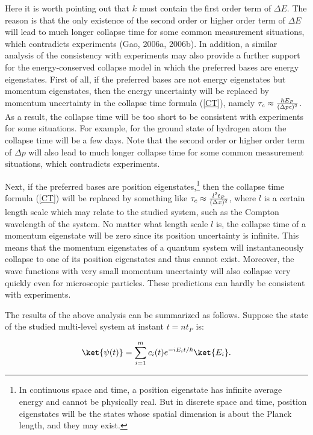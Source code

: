 Here it is worth pointing out that $k$ must contain the first order term of $ \Delta E$. The reason is that the only existence of the second order or higher order term of $ \Delta E$ will lead to much longer collapse time for some common measurement situations, which contradicts experiments (Gao, 2006a, 2006b). In addition, a similar analysis of the consistency with experiments may also provide a further support for the energy-conserved collapse model in which the preferred bases are energy eigenstates. First of all, if the preferred bases are not energy eigenstates but momentum eigenstates, then the energy uncertainty will be replaced by momentum uncertainty in the collapse time formula (\ref{CT}), namely $\tau_c \approx {\hbar E_P \over {(\Delta p c)^2}}$. As a result, the collapse time will be too short to be consistent with experiments for some situations. For example, for the ground state of hydrogen atom the collapse time will be a few days. Note that the second order or higher order term of $ \Delta p$ will also lead to much longer collapse time for some common measurement situations, which contradicts experiments.

Next, if the preferred bases are position eigenstates,\footnote{In continuous space and time, a position eigenstate has infinite average energy and cannot be physically real. But in discrete space and time, position eigenstates will be the states whose spatial dimension is about the Planck length, and they may exist. } then the collapse time formula (\ref{CT}) will be replaced by something like $\tau_c \approx {l^2 t_P \over {(\Delta x)^2}}$, where $l$ is a certain length scale which may relate to the studied system, such as the Compton wavelength of the system. No matter what length scale $l$ is, the collapse time of a momentum eigenstate will be zero since its position uncertainty is infinite. This means that the momentum eigenstates of a quantum system will instantaneously collapse  to one of its position eigenstates and thus cannot exist. Moreover, the wave functions with very small momentum uncertainty will also collapse very quickly even for microscopic particles. These predictions can hardly be consistent with experiments.

The results of the above analysis can be summarized as follows. Suppose the state of the studied multi-level system at instant $t=nt_P$ is:

\begin{equation}
\ket{\psi(t)}=\sum_{i=1}^m{c_i(t) e^{-iE_it/\hbar}\ket{E_i}}.
\label{}
\end{equation}

